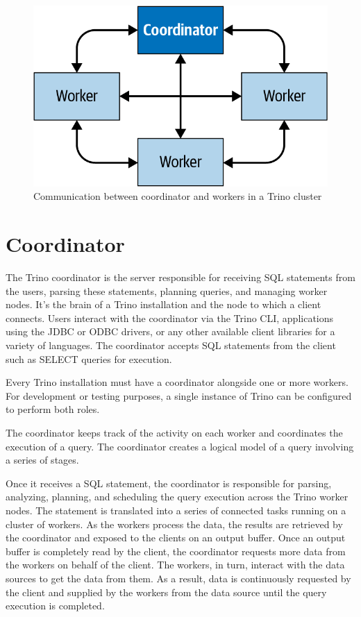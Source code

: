 \begin{figure}[htbp]
\centering
\includegraphics[width=\linewidth]{images/trino_communication.png}
\caption{Communication between coordinator and workers in a Trino cluster}\label{fig:trino-communication}
\end{figure}

\section{Coordinator}
The Trino coordinator is the server responsible for receiving SQL statements from the users, parsing these statements, planning queries, and managing worker nodes. It’s the brain of a Trino installation and the node to which a client connects. Users interact with the coordinator via the Trino CLI, applications using the JDBC or ODBC drivers, or any other available client libraries for a variety of languages. The coordinator accepts SQL statements from the client such as SELECT queries for execution.

Every Trino installation must have a coordinator alongside one or more workers. For development or testing purposes, a single instance of Trino can be configured to perform both roles.

The coordinator keeps track of the activity on each worker and coordinates the execution of a query. The coordinator creates a logical model of a query involving a series of stages.

Once it receives a SQL statement, the coordinator is responsible for parsing, analyzing, planning, and scheduling the query execution across the Trino worker nodes. The statement is translated into a series of connected tasks running on a cluster of workers. As the workers process the data, the results are retrieved by the coordinator and exposed to the clients on an output buffer. Once an output buffer is completely read by the client, the coordinator requests more data from the workers on behalf of the client. The workers, in turn, interact with the data sources to get the data from them. As a result, data is continuously requested by the client and supplied by the workers from the data source until the query execution is completed.


